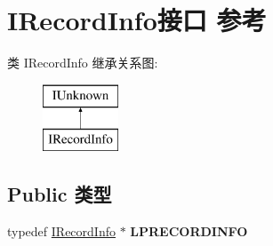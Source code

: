 \hypertarget{interface_i_record_info}{}\section{I\+Record\+Info接口 参考}
\label{interface_i_record_info}
类 I\+Record\+Info 继承关系图\+:\begin{figure}[H]
\begin{center}
\leavevmode
\includegraphics[height=2.000000cm]{interface_i_record_info}
\end{center}
\end{figure}
\subsection*{Public 类型}
\begin{DoxyCompactItemize}
\item 
\mbox{\label{interface_i_record_info_a80f7737589e4cb74c2ef68c8fa87408a}} 
typedef \hyperlink{interface_i_record_info}{I\+Record\+Info} $\ast$ {\bfseries L\+P\+R\+E\+C\+O\+R\+D\+I\+N\+FO}
\end{DoxyCompactItemize}
